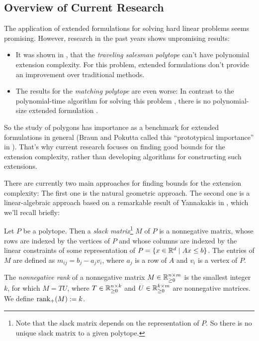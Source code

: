 \subsection{Overview of Current Research}

The application of extended formulations for solving hard linear problems seems promising. However, research in the past years shows unpromising results:

\begin{itemize}
  \item It was shown in \cite{fiorini2015exponential}, that the \emph{traveling salesman polytope} can't have polynomial extension complexity. For this problem, extended formulations don't provide an improvement over traditional methods.
  \item The results for the \emph{matching polytope} are even worse: In contrast to the polynomial-time algorithm for solving this problem \cite{ford1956maximal}, there is no polynomial-size extended formulation \cite{rothvoss2017matching}.
\end{itemize}

So the study of polygons has importance as a benchmark for extended formulations in general (Braun and Pokutta called this ``prototypical importance'' in \cite{braun2015matching}).
That's why current research focuses on finding good bounds for the extension complexity, rather than developing algorithms for constructing such extensions.

There are currently two main approaches for finding bounds for the extension complexity: The first one is the natural geometric approach. The second one is a linear-algebraic approach based on a remarkable result of Yannakakis in \cite{yannakakis1991expressing}, which we'll recall briefly:

\begin{definition}
  Let $P$ be a polytope.
  Then a \emph{slack matrix}\footnote{Note that the slack matrix depends on the representation of $P$. So there is no unique slack matrix to a given polytope.} $M$ of $P$ is a nonnegative matrix, whose rows are indexed by the vertices of $P$ and whose columns are indexed by the linear constraints of some representation of $P=\{x \in \mathbb{R}^d \mid Ax \leq b\}$.
  The entries of $M$ are defined as $m_{ij} = b_j - a_j v_i$, where $a_j$ is a row of $A$ and $v_i$ is a vertex of $P$.
\end{definition}

\begin{definition}
  The \emph{nonnegative rank} of a nonnegative matrix $M \in \mathbb{R}_{\geq 0}^{n \times m}$ is the smallest integer $k$, for which $M = TU$, where $T \in \mathbb{R}_{\geq 0}^{n \times k}$ and $U \in \mathbb{R}_{\geq 0}^{k \times m}$ are nonnegative matrices.
  We define $\operatorname{rank}_+(M) := k$.
\end{definition}

